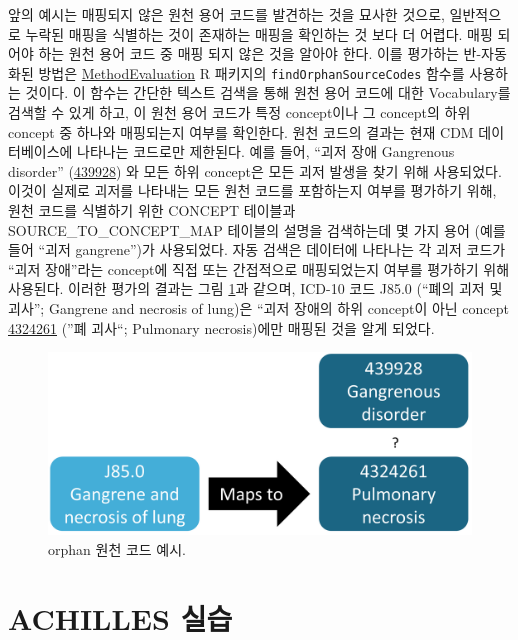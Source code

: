 \documentclass[10.5pt]{book}
\theoremstyle{definition}
\theoremstyle{definition}
\theoremstyle{definition}
\theoremstyle{remark}
\begin{document}
앞의 예시는 매핑되지 않은 원천 용어 코드를 발견하는 것을 묘사한 것으로,
일반적으로 누락된 매핑을 식별하는 것이 존재하는 매핑을 확인하는 것 보다
더 어렵다. 매핑 되어야 하는 원천 용어 코드 중 매핑 되지 않은 것을 알아야
한다. 이를 평가하는 반-자동화된 방법은
\href{https://ohdsi.github.io/MethodEvaluation/}{MethodEvaluation} R
패키지의 \texttt{findOrphanSourceCodes} 함수를 사용하는 것이다. 이
함수는 간단한 텍스트 검색을 통해 원천 용어 코드에 대한 Vocabulary를
검색할 수 있게 하고, 이 원천 용어 코드가 특정 concept이나 그 concept의
하위 concept 중 하나와 매핑되는지 여부를 확인한다. 원천 코드의 결과는
현재 CDM 데이터베이스에 나타나는 코드로만 제한된다. 예를 들어, ``괴저
장애 Gangrenous disorder''
(\href{http://athena.ohdsi.org/search-terms/terms/439928}{439928}) 와
모든 하위 concept은 모든 괴저 발생을 찾기 위해 사용되었다. 이것이 실제로
괴저를 나타내는 모든 원천 코드를 포함하는지 여부를 평가하기 위해, 원천
코드를 식별하기 위한 CONCEPT 테이블과 SOURCE\_TO\_CONCEPT\_MAP 테이블의
설명을 검색하는데 몇 가지 용어 (예를 들어 ``괴저 gangrene'')가
사용되었다. 자동 검색은 데이터에 나타나는 각 괴저 코드가 ``괴저
장애''라는 concept에 직접 또는 간접적으로 매핑되었는지 여부를 평가하기
위해 사용된다. 이러한 평가의 결과는 그림 \ref{fig:missingMapping}과
같으며, ICD-10 코드 J85.0 (``폐의 괴저 및 괴사''; Gangrene and necrosis
of lung)은 ``괴저 장애의 하위 concept이 아닌 concept
\href{http://athena.ohdsi.org/search-terms/terms/4324261}{4324261} (''폐
괴사``; Pulmonary necrosis)에만 매핑된 것을 알게 되었다.

\begin{figure}

{\centering \includegraphics[width=0.7\linewidth]{images/DataQuality/missingMapping} 

}

\caption{orphan 원천 코드 예시. }\label{fig:missingMapping}
\end{figure}

\section{ACHILLES 실습}\label{achillesInPractice}
\end{document}
